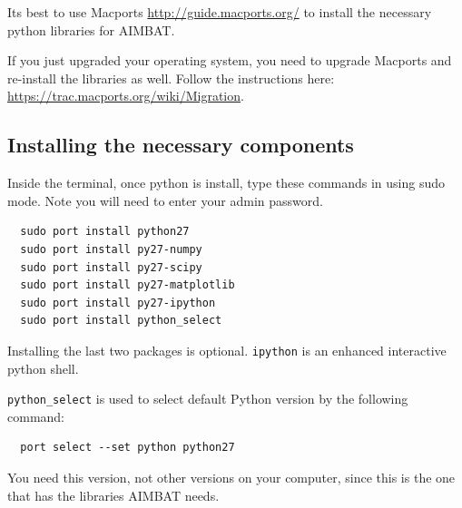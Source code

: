 \documentclass[letterpaper,10pt]{article}
\begin{document}
Its best to use Macports \url{http://guide.macports.org/} to install the necessary python libraries for AIMBAT. 

If you just upgraded your operating system, you need to upgrade Macports and re-install the libraries as well. Follow the instructions here: \url{https://trac.macports.org/wiki/Migration}.


\subsection{Installing the necessary components}

Inside the terminal, once python is install, type these commands in using sudo mode. Note you will need to enter your admin password.

\begin{verbatim}
  sudo port install python27
  sudo port install py27-numpy
  sudo port install py27-scipy
  sudo port install py27-matplotlib
  sudo port install py27-ipython
  sudo port install python_select
\end{verbatim}

Installing the last two packages is optional. \verb"ipython" is an enhanced interactive python shell.

\verb"python_select" is used to select default Python version by the following command:

\begin{verbatim}
  port select --set python python27
\end{verbatim}

You need this version, not other versions on your computer, since this is the one that has the libraries AIMBAT needs.


\end{document}

